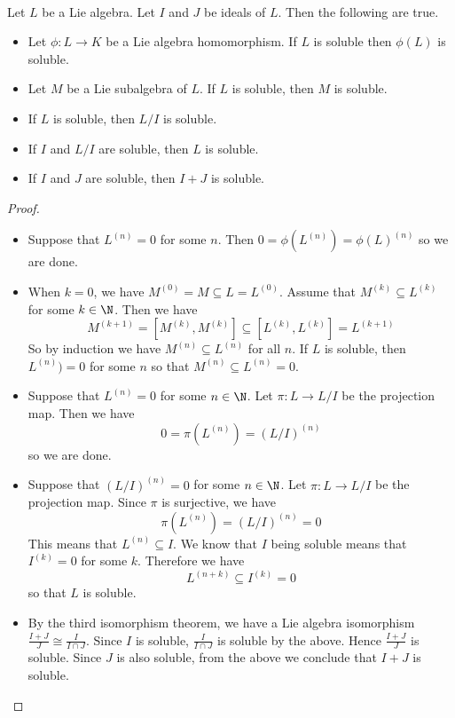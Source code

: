 \documentclass[a4paper]{article}
\begin{document}
\begin{prp}{}{} \\Let $L$ be a Lie algebra. Let $I$ and $J$ be ideals of $L$. Then the following are true. 
\begin{itemize}
\item Let $\phi:L\to K$ be a Lie algebra homomorphism. If $L$ is soluble then $\phi(L)$ is soluble. 
\item Let $M$ be a Lie subalgebra of $L$. If $L$ is soluble, then $M$ is soluble. 
\item If $L$ is soluble, then $L/I$ is soluble. 
\item If $I$ and $L/I$ are soluble, then $L$ is soluble. 
\item If $I$ and $J$ are soluble, then $I+J$ is soluble. 
\end{itemize} 
\begin{proof}~\\
\begin{itemize}
\item Suppose that $L^{(n)}=0$ for some $n$. Then $0=\phi(L^{(n)})=\phi(L)^{(n)}$ so we are done. 
\item When $k=0$, we have $M^{(0)}=M\subseteq L=L^{(0)}$. Assume that $M^{(k)}\subseteq L^{(k)}$ for some $k\in\N$. Then we have $$M^{(k+1)}=[M^{(k)},M^{(k)}]\subseteq[L^{(k)},L^{(k)}]=L^{(k+1)}$$ So by induction we have $M^{(n)}\subseteq L^{(n)}$ for all $n$. If $L$ is soluble, then $L^{(n)})=0$ for some $n$ so that $M^{(n)}\subseteq L^{(n)}=0$. 
\item Suppose that $L^{(n)}=0$ for some $n\in\N$. Let $\pi:L\to L/I$ be the projection map. Then we have $$0=\pi(L^{(n)})=(L/I)^{(n)}$$ so we are done. 
\item Suppose that $(L/I)^{(n)}=0$ for some $n\in\N$. Let $\pi:L\to L/I$ be the projection map. Since $\pi$ is surjective, we have $$\pi(L^{(n)})=(L/I)^{(n)}=0$$ This means that $L^{(n)}\subseteq I$. We know that $I$ being soluble means that $I^{(k)}=0$ for some $k$. Therefore we have $$L^{(n+k)}\subseteq I^{(k)}=0$$ so that $L$ is soluble. 
\item By the third isomorphism theorem, we have a Lie algebra isomorphism $\frac{I+J}{J}\cong\frac{I}{I\cap J}$. Since $I$ is soluble, $\frac{I}{I\cap J}$ is soluble by the above. Hence $\frac{I+J}{J}$ is soluble. Since $J$ is also soluble, from the above we conclude that $I+J$ is soluble. 
\end{itemize}
\end{proof}
\end{prp}
\end{document}
